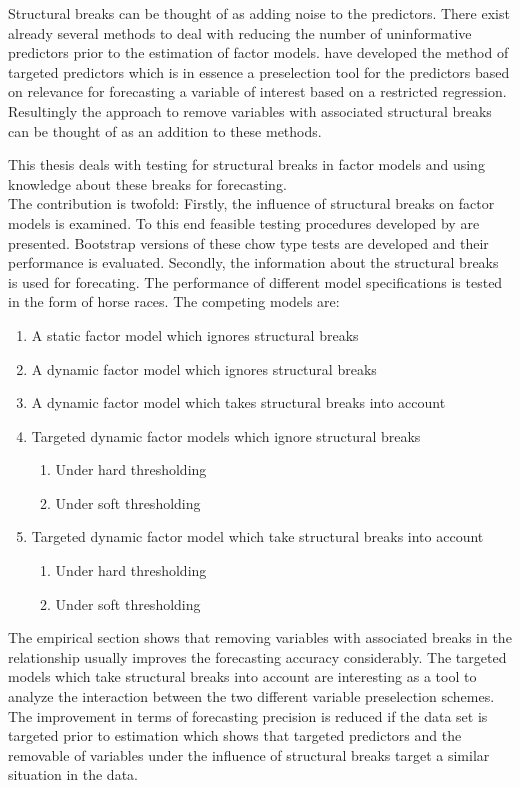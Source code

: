 \documentclass[12pt]{article}
\begin{document}
Structural breaks can be thought of as adding noise to the predictors. There exist already several methods to deal with reducing the number of uninformative predictors prior to the estimation of factor models. \citet{bai2008forecasting} have developed the method of targeted predictors which is in essence a preselection tool for the predictors based on relevance for forecasting a variable of interest based on a restricted regression. Resultingly the approach to remove variables with associated structural breaks can be thought of as an addition to these methods.

This thesis deals with testing for structural breaks in factor models and using knowledge about these breaks for forecasting. \\
The contribution is twofold: Firstly, the influence of structural breaks on factor models is examined. To this end feasible testing procedures developed by \citet{breitung2011testing} are presented. Bootstrap versions of these chow type tests are developed and their performance is evaluated. Secondly, the information about the structural breaks is used for forecating. The performance of different model specifications is tested in the form of horse races. The competing models are:

\begin{enumerate}
	\item A static factor model which ignores structural breaks
	\item A dynamic factor model which ignores structural breaks
	\item A dynamic factor model which takes structural breaks into account
	\item Targeted dynamic factor models which ignore structural breaks
		\begin{enumerate}
			\item Under hard thresholding
			\item Under soft thresholding
		\end{enumerate}
	\item Targeted dynamic factor model which take structural breaks into account
		\begin{enumerate}
			\item Under hard thresholding
			\item Under soft thresholding
		\end{enumerate}
\end{enumerate}

The empirical section shows that removing variables with associated breaks in the relationship usually improves the forecasting accuracy considerably. The targeted models which take structural breaks into account are interesting as a tool to analyze the interaction between the two different variable preselection schemes. The improvement in terms of forecasting precision is reduced if the data set is targeted prior to estimation which shows that targeted predictors and the removable of variables under the influence of structural breaks target a similar situation in the data.
\end{document}

